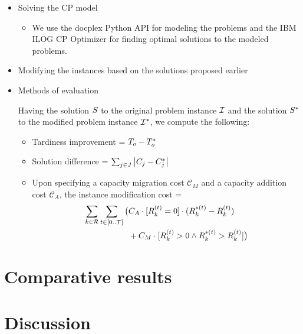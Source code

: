 \begin{itemize}

    \item Solving the CP model
    \begin{itemize}
        \item We use  the \ac{docplex} Python API for modeling the problems
            and the IBM ILOG CP Optimizer for finding optimal solutions to the modeled problems.
    \end{itemize}
    

    \item Modifying the instances based on the solutions proposed earlier

    \item Methods of evaluation
    
        Having the solution $S$ to the original problem instance $\mathcal{I}$
        and the solution $S^*$ to the modified problem instance $\mathcal{I}^*$,
        we compute the following:
        \begin{itemize}
            \item Tardiness improvement = $T_{o} - T_{o}^*$
            \item Solution difference = $\sum_{j \in J} \left|{C_{j} - C_{j}^*}\right|$
            \item Upon specifying a capacity migration cost $\mathcal{C}_M$ and a capacity addition cost $\mathcal{C}_A$,
                the instance modification cost =
                \begin{align*}
                    \sum_{k \in \Resources} \sum_{t \in \intinterval{0}{\horizon}}
                    \big( &C_A \cdot [\capacity{k}{t} = 0] \cdot (\capacity{k}{t}^* - \capacity{k}{t} ) \\
                    &+ C_M \cdot [\capacity{k}{t} > 0 \land \capacity{k}{t}^* > \capacity{k}{t}] \big)
                \end{align*}

        \end{itemize}
\end{itemize}

\section{Comparative results} \label{sec:numerical-experiments/comparative-results}

\section{Discussion} \label{sec:numerical-experiments/discussion}
